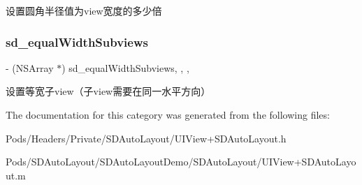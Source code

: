 设置圆角半径值为view宽度的多少倍 \mbox{\label{category_u_i_view_07_s_d_layout_extention_08_a094535c423c19377bc59c9e96e866839}} 
\subsubsection{\texorpdfstring{sd\+\_\+equal\+Width\+Subviews}{sd\_equalWidthSubviews}}
{\footnotesize\ttfamily -\/ (N\+S\+Array $\ast$) sd\+\_\+equal\+Width\+Subviews\hspace{0.3cm}{\ttfamily [read]}, {\ttfamily [write]}, {\ttfamily [nonatomic]}, {\ttfamily [strong]}}

设置等宽子view（子view需要在同一水平方向） 

The documentation for this category was generated from the following files\+:\begin{DoxyCompactItemize}
\item 
Pods/\+Headers/\+Private/\+S\+D\+Auto\+Layout/U\+I\+View+\+S\+D\+Auto\+Layout.\+h\item 
Pods/\+S\+D\+Auto\+Layout/\+S\+D\+Auto\+Layout\+Demo/\+S\+D\+Auto\+Layout/U\+I\+View+\+S\+D\+Auto\+Layout.\+m\end{DoxyCompactItemize}
